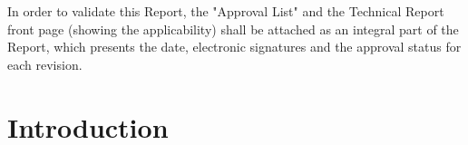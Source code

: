 \documentclass[12pt]{article} %
\numberwithin{figure}{section}
\numberwithin{table}{section}
\begin{document}
\vspace{3.0cm}

In order to validate this Report, the "Approval List" and the Technical Report front page (showing the applicability) shall be attached as an integral part of the Report, which presents the date, electronic signatures and the approval status for each revision.

\vfill


\newpage

\setcounter{page}{1}


\tableofcontents %

\newpage %


\listoffigures

\newpage %


\listoftables

\newpage %

\renewcommand*{\thepage}{\arabic{section}-\arabic{page}}

\setcounter{page}{1}
\section{Introduction}
    

\setcounter{page}{1}
\end{document}
